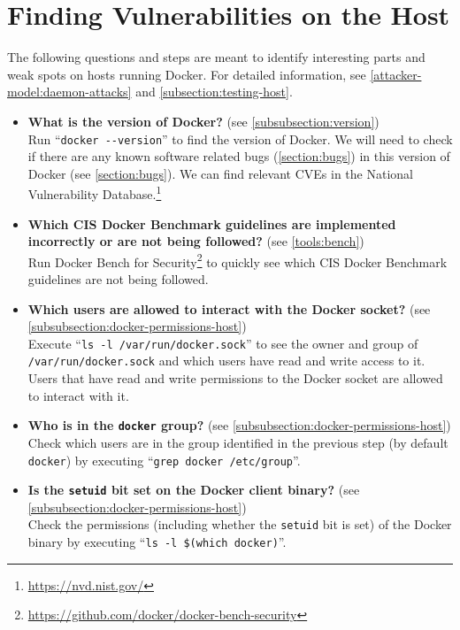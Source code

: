 \section{Finding Vulnerabilities on the Host}\label{section:checklist-vulnerabilities-host}
The following questions and steps are meant to identify interesting parts and weak spots on hosts running Docker. For detailed information, see \autoref{attacker-model:daemon-attacks} and \autoref{subsection:testing-host}.

\begin{itemize}
    \item \textbf{What is the version of Docker?} (see \autoref{subsubsection:version})\\
        Run ``\lstinline{docker --version}'' to find the version of Docker. We will need to check if there are any known software related bugs (\autoref{section:bugs}) in this version of Docker (see \autoref{section:bugs}). We can find relevant CVEs in the National Vulnerability Database.\footnote{\url{https://nvd.nist.gov/}}

    \item \textbf{Which CIS Docker Benchmark guidelines are implemented incorrectly or are not being followed?} (see \autoref{tools:bench})\\
        Run Docker Bench for Security\footnote{\url{https://github.com/docker/docker-bench-security}} to quickly see which CIS Docker Benchmark guidelines are not being followed.

    \item \textbf{Which users are allowed to interact with the Docker socket?} (see \autoref{subsubsection:docker-permissions-host})\\
    Execute ``\lstinline{ls -l /var/run/docker.sock}'' to see the owner and group of \lstinline{/var/run/docker.sock} and which users have read and write access to it. Users that have read and write permissions to the Docker socket are allowed to interact with it.

    \item \textbf{Who is in the \lstinline{docker} group?} (see \autoref{subsubsection:docker-permissions-host})\\
    Check which users are in the group identified in the previous step (by default \lstinline{docker}) by executing ``\lstinline{grep docker /etc/group}''.

    \item \textbf{Is the \lstinline{setuid} bit set on the Docker client binary?} (see \autoref{subsubsection:docker-permissions-host})\\
    Check the permissions (including whether the \lstinline{setuid} bit is set) of the Docker binary by executing ``\lstinline{ls -l $(which docker)}''.


\end{itemize}

